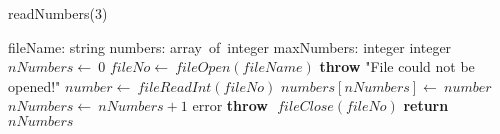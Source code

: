 \documentclass[a4paper,10pt]{article}
\begin{document}
\begin{algorithm}
\caption{readNumbers(3)}
\begin{algorithmic}[5]
\State {}
\State {}
\State {}
    \State fileName: string
    \State numbers: array\ of\ integer
    \State maxNumbers: integer
  \EndDecl
    \State integer
  \EndDecl
  \State \(nNumbers\gets\ 0\)
  \State \(fileNo\gets\ fileOpen(fileName)\)
    \State \textbf{throw} \(\)"{}File could not be opened!"{}\(\)
  \EndIf
  \Try
      \State \(number\gets\ fileReadInt(fileNo)\)
      \State \(numbers[nNumbers]\gets\ number\)
      \State \(nNumbers\gets\ nNumbers+1\)
    \EndWhile
  \EndTry
  \Catch error
    \State \textbf{throw} \(\)
  \EndCatch %
  \Finally
    \State \(fileClose(fileNo)\)
  \EndFinally
  \State \textbf{return} \(nNumbers\)
\EndFunction
\end{algorithmic}
\end{algorithm}
\end{document}
